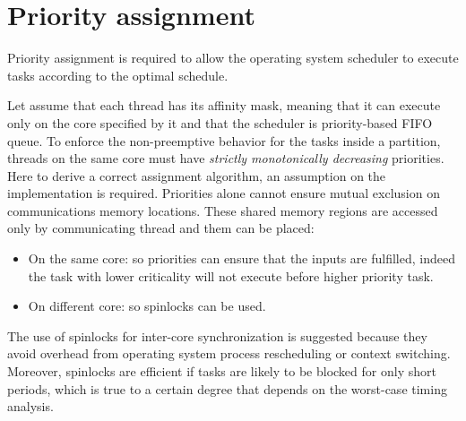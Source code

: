 
\section{Priority assignment}\label{sec:priorityassignment}
Priority assignment is required to allow the operating system scheduler to execute tasks according to the optimal schedule. 
\par Let assume that each thread has its affinity mask, meaning that it can execute only on the core specified by it and that the scheduler is priority-based FIFO queue. To enforce the non-preemptive behavior for the tasks inside a partition, threads on the same core must have \emph{strictly monotonically decreasing} priorities. Here to derive a correct assignment algorithm, an assumption on the implementation is required. Priorities alone cannot ensure mutual exclusion on communications memory locations. These shared memory regions are accessed only by communicating thread and them can be placed:
\begin{itemize}
\item On the same core: so priorities can ensure that the inputs are fulfilled, indeed the task with lower criticality will not execute before higher priority task.
\item On different core: so spinlocks can be used.
\end{itemize}
The use of spinlocks for inter-core synchronization is suggested because they avoid overhead from operating system process rescheduling or context switching. Moreover, spinlocks are efficient if tasks are likely to be blocked for only short periods, which is true to a certain degree that depends on the worst-case timing analysis. 


